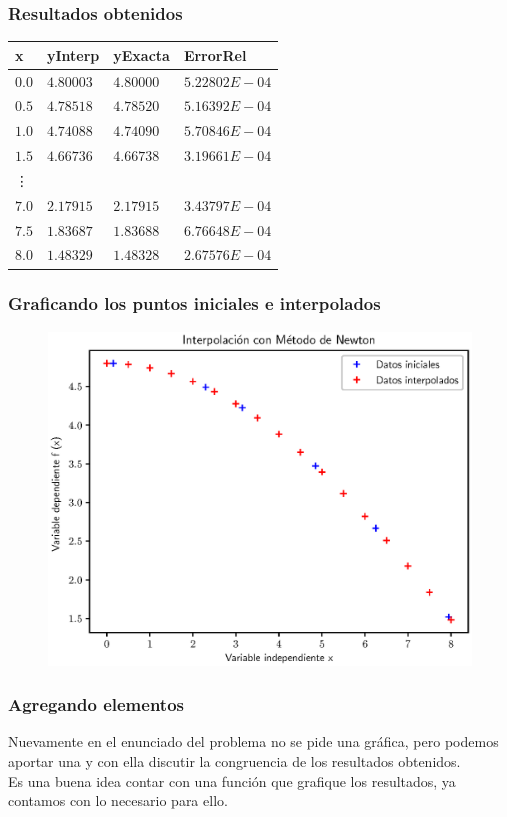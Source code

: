 \documentclass[12pt]{beamer}
\begin{document}
\begin{frame}
\frametitle{Resultados obtenidos}
\begin{table}
\small
\centering
\renewcommand{\arraystretch}{0.9}
\begin{tabular}{l l l l}
x & yInterp & yExacta & ErrorRel\\ \hline
$0.0$ & $4.80003$ & $4.80000$ & $5.22802E-04$ \\
$0.5$ & $4.78518$ & $4.78520$ & $5.16392E-04$ \\
$1.0$ & $4.74088$ & $4.74090$ & $5.70846E-04$ \\
$1.5$ & $4.66736$ & $4.66738$ & $3.19661E-04$ \\
\vdots \\
$7.0$ & $2.17915$ & $2.17915$ & $3.43797E-04$ \\
$7.5$ & $1.83687$ & $1.83688$ & $6.76648E-04$ \\
$8.0$ & $1.48329$ & $1.48328$ & $2.67576E-04$
\end{tabular}
\end{table}
\end{frame}
\begin{frame}
\frametitle{Graficando los puntos iniciales e interpolados}
\begin{figure}
    \centering
    \includegraphics[scale=0.58]{Imagenes/Ejercicio_Newton_02.eps}
\end{figure}
\end{frame}
\begin{frame}
\frametitle{Agregando elementos}
Nuevamente en el enunciado del problema no se pide una gráfica, pero podemos aportar una y con ella discutir la congruencia de los resultados obtenidos.
\\
\bigskip
\pause
Es una buena idea contar con una función que grafique los resultados, ya contamos con lo necesario para ello.
\end{frame}
\end{document}
